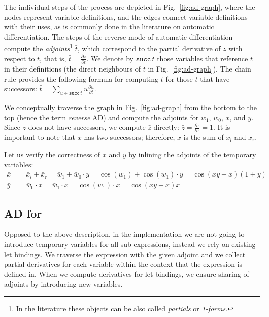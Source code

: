 The individual steps of the process are depicted in Fig.~\ref{fig:ad-graph},
where the nodes represent variable definitions, and the edges connect variable
definitions with their uses, as is commonly done in the literature on automatic
differentiation. The steps of the reverse mode of automatic differentiation
compute the \textit{adjoints}\footnote{In the literature these objects can be
also called \emph{partials} or \emph{1-forms}.} \(\bar{t}\), which correspond to the partial
derivative of \(z\) with respect to \(t\), that is, \(\bar{t} = \frac{\partial
z}{\partial t}\). We denote by \(\mathtt{succ}\, t\) those variables that
reference \(t\) in their definitions (the direct neighbours of \(t\) in
Fig.~\ref{fig:ad-graph}). The chain rule provides the following formula for
computing \(\bar{t}\) for those \(t\) that have successors:
\(
\bar{t} = \sum_{u \in \mathtt{succ}\, t} \bar{u} \frac{\partial u}{\partial t}.
\)

We conceptually traverse the graph in Fig.~\ref{fig:ad-graph} from the bottom
to the top (hence the term \emph{reverse} AD) and compute the
adjoints for \(\bar{w}_1\), \(\bar{w}_0\), \(\bar{x}\), and \(\bar{y}\). Since
\(z\) does not have successors, we compute \(\bar{z}\) directly: \(\bar{z} =
\frac{\partial z}{\partial z} = 1\). It is important to note that \(x\) has two
successors; therefore, \(\bar{x}\) is the sum of \(\bar{x}_l\) and
\(\bar{x}_r\).

Let us verify the correctness of \(\bar{x}\) and \(\bar{y}\) by inlining the
adjoints of the temporary variables:
\begin{align*}
  \bar{x} &= \bar{x}_l + \bar{x}_r = \bar{w}_1 + \bar{w}_0\cdot y 
          = \cos(w_1) + \cos(w_1)\cdot y = \cos(xy +x)(1 + y)\\
  \bar{y} &= \bar{w}_0\cdot x = \bar{w}_1 \cdot x = \cos(w_1)\cdot x = \cos(xy + x)x
\end{align*}


\subsection{AD for }

Opposed to the above description, in the implementation we are not
going to introduce temporary
variables for all sub-expressions, instead we rely on existing
let bindings.  We traverse the expression with the given adjoint and
we collect partial derivatives for each variable within the context that
the expression is defined in.  When we compute derivatives for let
bindings, we ensure sharing of adjoints by introducing
new variables.
 
